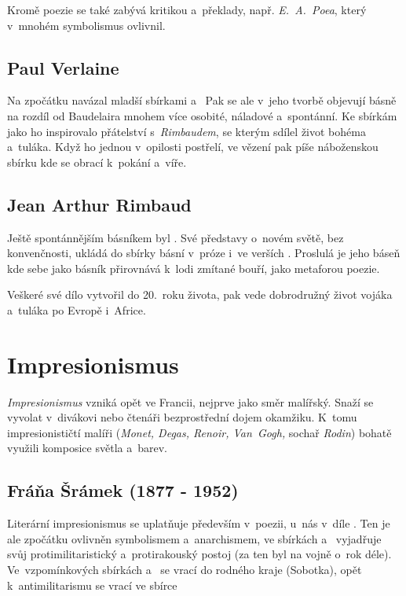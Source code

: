 Kromě poezie se také zabývá kritikou a~překlady, např.
\emph{E.~A.~Poea}, který v~mnohém symbolismus ovlivnil.

\subsection*{Paul Verlaine}
Na  zpočátku navázal mladší 
sbírkami  a~ Pak se ale
v~jeho tvorbě objevují básně na rozdíl od Baudelaira mnohem více
osobité, náladové a~spontánní. Ke sbírkám jako  ho
inspirovalo přátelství s~\emph{Rimbaudem}, se kterým sdílel život bohéma
a~tuláka. Když ho jednou v~opilosti postřelí, ve vězení pak píše
náboženskou sbírku  kde se obrací k~pokání a~víře.

\subsection*{Jean Arthur Rimbaud}
Ještě spontánnějším básníkem byl . Své
představy o~novém světě, bez konvenčnosti, ukládá do sbírky básní
v~próze i~ve verších . Proslulá je jeho báseň
 kde sebe jako básník přirovnává k~lodi zmítané
bouří, jako metaforou poezie. 

Veškeré své dílo vytvořil do 20.~roku života, pak vede dobrodružný život
vojáka a~tuláka po Evropě i~Africe.

\section{Impresionismus}
\emph{Impresionismus} vzniká opět ve Francii, nejprve jako směr
malířský. Snaží se vyvolat v~divákovi nebo čtenáři bezprostřední dojem
okamžiku. K~tomu impresionističtí malíři (\emph{Monet, Degas, Renoir,
Van~Gogh,} sochař \emph{Rodin}) bohatě využili komposice světla a~barev.

\subsection*{Fráňa Šrámek (1877 - 1952)}
Literární impresionismus se uplatňuje především v~poezii, u~nás v~díle
. Ten je ale zpočátku ovlivněn
symbolismem a~anarchismem, ve sbírkách  a~ vyjadřuje svůj protimilitaristický
a~protirakouský postoj (za ten byl na vojně o~rok déle).
Ve~vzpomínkových sbírkách  a~ se vrací do
rodného kraje (Sobotka), opět k~antimilitarismu se vrací ve sbírce

